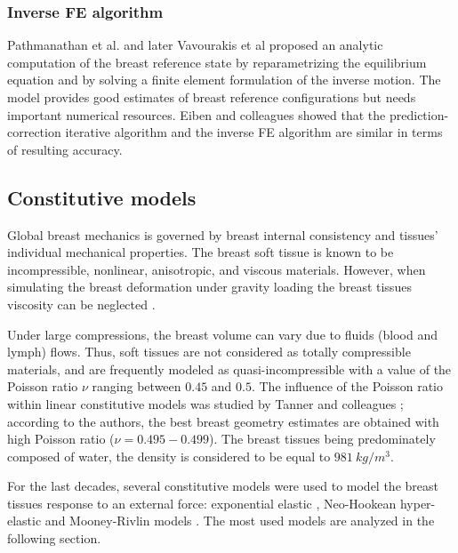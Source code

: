  \subsubsection*{Inverse FE algorithm}
Pathmanathan et al. \citep{pathmanathan_predicting_2008} and later Vavourakis et al \citep{vavourakis_inverse_2016} proposed an analytic computation of the breast reference state by reparametrizing the equilibrium equation and by solving a finite element formulation of the inverse motion. The model provides good estimates of breast reference configurations but needs important numerical resources. Eiben and colleagues \citep{eiben_breast_2014} showed that the prediction-correction iterative algorithm and the inverse FE algorithm are similar in terms of resulting accuracy. 

\subsection{Constitutive models}

Global breast mechanics is governed by breast internal consistency and tissues' individual mechanical properties. The breast soft tissue is known to be incompressible, nonlinear, anisotropic, and viscous materials. However, when simulating the breast deformation under gravity loading the breast tissues viscosity can be neglected \citep{wellman_breast_1999}.  

Under large compressions, the breast volume can vary due to fluids (blood and lymph) flows. Thus, soft tissues are not considered as totally compressible materials, and are frequently modeled as quasi-incompressible with a value of the Poisson ratio $\nu$ ranging between $0.45$ and $0.5$. The influence of the Poisson ratio within linear constitutive models was studied by Tanner and colleagues \citep{tanner_factors_2006}; according to the authors, the best breast geometry estimates are obtained with high Poisson ratio ($\nu = {0.495-0.499}$). The breast tissues being predominately composed of water, the density is considered to be equal to $981\ kg/m^3$.  


For the last decades, several constitutive models were used to model the breast tissues response to an external force: exponential elastic \citep{azar_methods_2002}, Neo-Hookean hyper-elastic \citep{carter_biomechanical_2009,rajagopal_modeling_2010,sturgeon_finite_element_2016, eiben_breast_2016, han_nonlinear_2014, garcia_mapping_2017} and Mooney-Rivlin models \citep{samani_elastic_2007,tanner_factors_2006,carter_application_2012,martinez_finite_2017}. 
The most used models are analyzed in the following section.
 
